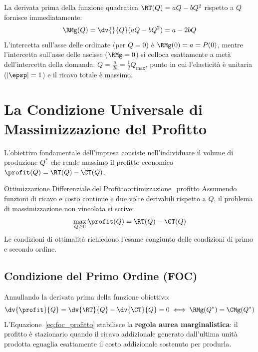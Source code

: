 \begin{dimostrazione}
La derivata prima della funzione quadratica $\RT(Q) = aQ - bQ^2$ rispetto a $Q$ fornisce immediatamente:
\begin{equation*}
    \RMg(Q) = \dv{}{Q}(aQ - bQ^2) = a - 2bQ
\end{equation*}
L'intercetta sull'asse delle ordinate (per $Q = 0$) è $\RMg(0) = a = P(0)$, mentre l'intercetta sull'asse delle ascisse ($\RMg = 0$) si colloca esattamente a metà dell'intercetta della domanda: $Q = \frac{a}{2b} = \frac{1}{2} Q_{\max}$, punto in cui l'elasticità è unitaria ($|\epsp| = 1$) e il ricavo totale è massimo.
\end{dimostrazione}

\section{La Condizione Universale di Massimizzazione del Profitto}

L'obiettivo fondamentale dell'impresa consiste nell'individuare il volume di produzione $Q^*$ che rende massimo il profitto economico $\profit(Q) = \RT(Q) - \CT(Q)$.

\begin{modello}{Ottimizzazione Differenziale del Profitto}{ottimizzazione_profitto}
Assumendo funzioni di ricavo e costo continue e due volte derivabili rispetto a $Q$, il problema di massimizzazione non vincolata si scrive:
\begin{equation}
    \max_{Q \ge 0} \profit(Q) = \RT(Q) - \CT(Q)
\end{equation}
Le condizioni di ottimalità richiedono l'esame congiunto delle condizioni di primo e secondo ordine.
\end{modello}

\subsection{Condizione del Primo Ordine (FOC)}
Annullando la derivata prima della funzione obiettivo:
\begin{equation}
    \dv{\profit}{Q} = \dv{\RT}{Q} - \dv{\CT}{Q} = 0 \iff \RMg(Q^*) = \CMg(Q^*)
    \label{eq:foc_profitto}
\end{equation}
L'Equazione~\eqref{eq:foc_profitto} stabilisce la \textbf{regola aurea marginalistica}: il profitto è stazionario quando il ricavo addizionale generato dall'ultima unità prodotta eguaglia esattamente il costo addizionale sostenuto per produrla.

